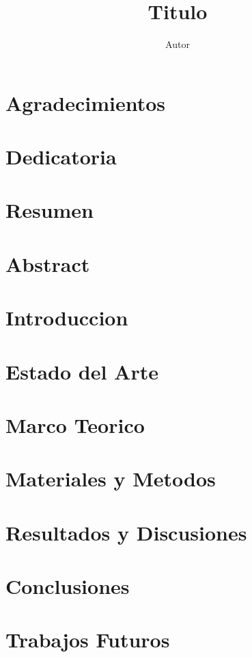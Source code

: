 \documentclass[12pt,a4paper]{report}
\author{Autor}
\title{Titulo}
\begin{document}

\chapter*{Agradecimientos}
\chapter*{Dedicatoria}
\tableofcontents
\listoffigures
\listoftables
\chapter*{Resumen}
\chapter*{Abstract}
\chapter{Introduccion}

\chapter{Estado del Arte}


\chapter{Marco Teorico}


\chapter{Materiales y Metodos}


\chapter{Resultados y Discusiones}


\chapter{Conclusiones}


\chapter{Trabajos Futuros}


\appendix
\chapter{}

\end{document}
